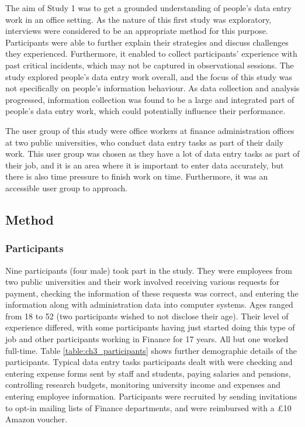 The aim of Study 1 was to get a grounded understanding of people's data entry work in an office setting. As the nature of this first study was exploratory, interviews were considered to be an appropriate method for this purpose. Participants were able to further explain their strategies and discuss challenges they experienced. Furthermore, it enabled to collect participants' experience with past critical incidents, which may not be captured in observational sessions. The study explored people's data entry work overall, and the focus of this study was not specifically on people's information behaviour. As data collection and analysis progressed, information collection was found to be a large and integrated part of people's data entry work, which could potentially influence their performance.

The user group of this study were office workers at finance administration offices at two public universities, who conduct data entry tasks as part of their daily work.  This user group was chosen as they have a lot of data entry tasks as part of their job, and it is an area where it is important to enter data accurately, but there is also time pressure to finish work on time. Furthermore, it was an accessible user group to approach.

\subsection{Method}
\subsubsection{Participants}
Nine participants (four male) took part in the study. They were employees from two public universities and their work involved receiving various requests for payment, checking the information of these requests was correct, and entering the information along with administration data into computer systems. Ages ranged from 18 to 52 (two participants wished to not disclose their age). Their level of experience differed, with some participants having just started doing this type of job and other participants working in Finance for 17 years. All but one worked full-time. Table \ref{table:ch3_participants} shows further demographic details of the participants. Typical data entry tasks participants dealt with were checking and entering expense forms sent by staff and students, paying salaries and pensions, controlling research budgets, monitoring university income and expenses and entering employee information. Participants were recruited by sending invitations to opt-in mailing lists of Finance departments, and were reimbursed with a \pounds10 Amazon voucher.

